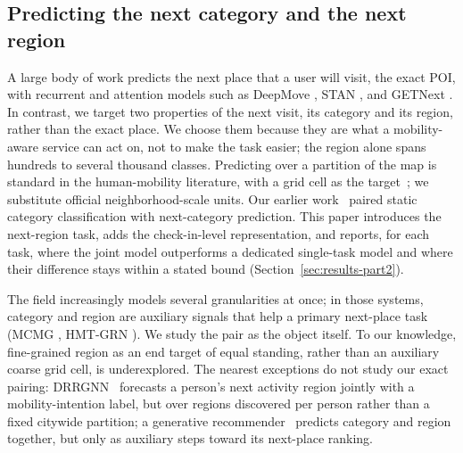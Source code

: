 \subsection{Predicting the next category and the next region}
\label{sec:related-tasks}
A large body of work predicts the next place that a user will visit, the exact POI,
with recurrent and attention models such as DeepMove \cite{feng2018deepmove}, STAN
\cite{luo2021stan}, and GETNext \cite{yang2022getnext}. In contrast, we target two properties of the next visit, its category and its
region, rather than the exact place. We choose them because they are
what a mobility-aware service can act on, not to make the task easier; the region
alone spans hundreds to several thousand classes. Predicting
over a partition of the map is standard in the human-mobility literature, with a grid cell as the
target~\cite{luca2021mobilitysurvey}; we substitute official neighborhood-scale units. Our earlier
work~\cite{silva2025mtlnet} paired static category classification with next-category prediction. This paper introduces the next-region task, adds the check-in-level
representation, and reports, for each task, where the joint model outperforms a dedicated single-task model
and where their difference stays within a stated bound (Section~\ref{sec:results-part2}).

The field
increasingly models several granularities at once; in those systems, category and
region are auxiliary signals that help a primary next-place task
(MCMG \cite{sun2024mcmg}, HMT-GRN \cite{lim2022hmtgrn}).
We study the pair as the object itself. To our knowledge, fine-grained region as an
end target of equal standing, rather than an auxiliary coarse grid cell, is
underexplored.
The nearest exceptions do not study our exact pairing:
DRRGNN~\cite{zhu2022drrgnn} forecasts a person's next activity region jointly
with a mobility-intention label, but over regions discovered per person rather
than a fixed citywide partition; a generative recommender~\cite{sun2025kgtb}
predicts category and region together, but only as auxiliary steps toward its
next-place ranking.

